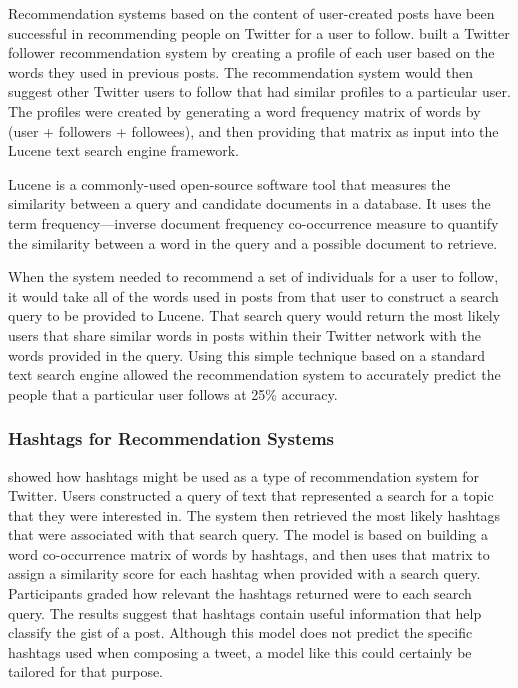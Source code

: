 \documentclass[man,floatsintext,donotrepeattitle]{apa6}
\begin{document}
Recommendation systems based on the content of user-created posts have been successful in recommending people on Twitter for a user to follow.
\textcite{Hannon2010} built a Twitter follower recommendation system by creating a profile of each user based on the words they used in previous posts.
The recommendation system would then suggest other Twitter users to follow that had similar profiles to a particular user.
The profiles were created by generating a word frequency matrix of words by (user + followers + followees), and then providing that matrix as input into the Lucene text search engine framework.

Lucene \parencite{McCandless2010} is a commonly-used open-source software tool that measures the similarity between a query and candidate documents in a database.
It uses the term frequency---inverse document frequency co-occurrence measure to quantify the similarity between a word in the query and a possible document to retrieve.

When the system needed to recommend a set of individuals for a user to follow, it would take all of the words used in posts from that user to construct a search query to be provided to Lucene.
That search query would return the most likely users that share similar words in posts within their Twitter network with the words provided in the query.
Using this simple technique based on a standard text search engine allowed the recommendation system to accurately predict the people that a particular user follows at 25\% accuracy.

\subsubsection{Hashtags for Recommendation Systems}

\textcite{Efron2010} showed how hashtags might be used as a type of recommendation system for Twitter.
Users constructed a query of text that represented a search for a topic that they were interested in.
The system then retrieved the most likely hashtags that were associated with that search query.
The model is based on building a word co-occurrence matrix of words by hashtags, and then uses that matrix to assign a similarity score for each hashtag when provided with a search query.
Participants graded how relevant the hashtags returned were to each search query.
The results suggest that hashtags contain useful information that help classify the gist of a post. 
Although this model does not predict the specific hashtags used when composing a tweet, a model like this could certainly be tailored for that purpose.
\end{document}

